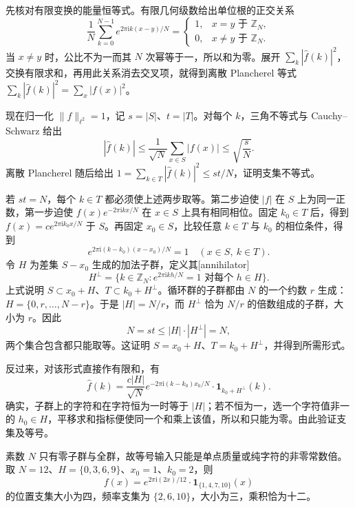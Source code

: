 \begin{solution}
先核对有限变换的能量恒等式。有限几何级数给出单位根的正交关系
\[
 \frac1N\sum_{k=0}^{N-1}e^{2\pi\mathrm i k(x-y)/N}
 =\begin{cases}1,&x=y\text{ 于 }\mathbb Z_N,\\0,&x\ne y\text{ 于 }\mathbb Z_N.\end{cases}
\]
当 \(x\ne y\) 时，公比不为一而其 \(N\) 次幂等于一，所以和为零。展开 \(\sum_k|\widehat f(k)|^2\)，交换有限求和，再用此关系消去交叉项，就得到离散 Plancherel 等式
\(\sum_k|\widehat f(k)|^2=\sum_x|f(x)|^2\)。

现在归一化 \(\|f\|_{\ell^2}=1\)，记 \(s=|S|\)、\(t=|T|\)。对每个 \(k\)，三角不等式与 Cauchy--Schwarz 给出
\[
 |\widehat f(k)|\leq\frac1{\sqrt N}\sum_{x\in S}|f(x)|
 \leq\sqrt{\frac sN}.
\]
离散 Plancherel 随后给出 \(1=\sum_{k\in T}|\widehat f(k)|^2\leq st/N\)，证明支集不等式。

若 \(st=N\)，每个 \(k\in T\) 都必须使上述两步取等。第二步迫使 \(|f|\) 在 \(S\) 上为同一正数，第一步迫使
\(f(x)e^{-2\pi\mathrm i kx/N}\) 在 \(x\in S\) 上具有相同相位。固定 \(k_0\in T\) 后，得到
\(f(x)=c e^{2\pi\mathrm i k_0x/N}\) 于 \(S\)。再固定 \(x_0\in S\)，比较任意 \(k\in T\) 与 \(k_0\) 的相位条件，得到
\[
 e^{2\pi\mathrm i(k-k_0)(x-x_0)/N}=1
 \quad(x\in S,\ k\in T).
\]
令 \(H\) 为差集 \(S-x_0\) 生成的加法子群，定义其[annihilator]
\[
 H^\perp=\{k\in\mathbb Z_N:
              e^{2\pi\mathrm i kh/N}=1\text{ 对每个 }h\in H\}.
\]
上式说明 \(S\subset x_0+H\)、\(T\subset k_0+H^\perp\)。循环群的子群都由 \(N\) 的一个约数 \(r\) 生成：
\(H=\{0,r,\ldots,N-r\}\)。于是 \(|H|=N/r\)，而 \(H^\perp\) 恰为 \(N/r\) 的倍数组成的子群，大小为 \(r\)。因此
\[
 N=st\leq|H|\cdot|H^\perp|=N,
\]
两个集合包含都只能取等。这证明 \(S=x_0+H\)、\(T=k_0+H^\perp\)，并得到所需形式。

反过来，对该形式直接作有限和，有
\[
 \widehat f(k)=\frac{c|H|}{\sqrt N}
 e^{-2\pi\mathrm i(k-k_0)x_0/N}\cdot
                    \mathbf1_{k_0+H^\perp}(k).
\]
确实，子群上的字符和在字符恒为一时等于 \(|H|\)；若不恒为一，选一个字符值非一的 \(h_0\in H\)，平移求和指标便使同一个和乘上该值，所以和只能为零。由此验证支集及等号。

素数 \(N\) 只有零子群与全群，故等号输入只能是单点质量或纯字符的非零常数倍。取 \(N=12\)、\(H=\{0,3,6,9\}\)、\(x_0=1\)、\(k_0=2\)，则
\[
 f(x)=e^{2\pi\mathrm i(2x)/12}\cdot
                   \mathbf1_{\{1,4,7,10\}}(x)
\]
的位置支集大小为四，频率支集为 \(\{2,6,10\}\)，大小为三，乘积恰为十二。
\end{solution}

